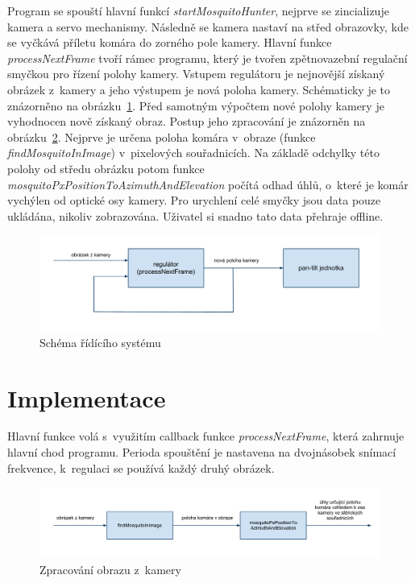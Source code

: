 \documentclass[a4paper,10pt]{article}
\begin{document}
		Program se spouští hlavní funkcí \textit{startMosquitoHunter}, 
		nejprve se zincializuje kamera a servo mechanismy. 
		Následně se kamera nastaví na střed obrazovky, kde se vyčkává příletu komára do zorného pole kamery. 		
		Hlavní funkce \textit{processNextFrame} tvoří rámec programu,
		který je tvořen zpětnovazební regulační smyčkou pro řízení polohy
		kamery. Vstupem regulátoru je nejnovější získaný obrázek z~kamery a jeho
		výstupem je nová poloha kamery. Schématicky je to znázorněno na
		obrázku~\ref{fig:ridiciSystem}.  Před samotným výpočtem nové polohy kamery
		je vyhodnocen nově zís\-ka\-ný obraz. Postup jeho zpracování je znázorněn na
		obrázku~\ref{fig:zpracovaniObrazu}.  Nejprve je určena poloha komára v~obraze
		(funkce \textit{findMosquitoInImage}) v~pixelových sou\-řad\-ni\-cích. Na základě odchylky
		této polohy od středu obrázku potom funkce
		\textit{mos\-quito\-Px\-PositionToAzimuthAndElevation} počítá odhad úhlů, o~které je
		komár vy\-chý\-len od optické osy kamery. Pro urychlení celé smyčky jsou data pouze
		ukládána, nikoliv zobrazována. Uživatel si snadno tato data přehraje offline.

		\begin{figure}[!h]
			\centering
			 \includegraphics[width=1\columnwidth]{pics/schema_ridiciho_systemu}
			 \caption{Schéma řídícího systému}\label{fig:ridiciSystem}
		\end{figure}

\section{Implementace}

		Hlavní funkce volá s~využitím callback funkce \textit{processNextFrame}, která zahrnuje hlavní chod
		programu. Perioda spouštění je nastavena na dvojnásobek snímací frekvence, k~regulaci se používá každý druhý obrázek.
		\begin{figure}[!h]
			\centering
			 \includegraphics[width=1\columnwidth]{pics/zpracovani_obrazu_z_kamery}
			 \caption{Zpracování obrazu z~kamery\label{fig:zpracovaniObrazu}}
		\end{figure}
\end{document}
